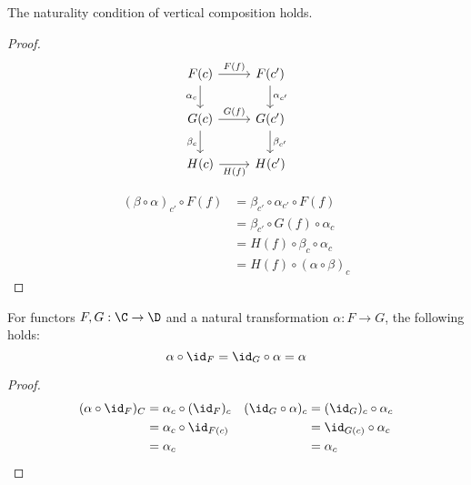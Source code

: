\begin{theorem}
  The naturality condition of vertical composition holds.
  \begin{proof}
    \[\begin{tikzcd}
      {F(c)} & {F(c')} \\
      {G(c)} & {G(c')} \\
      {H(c)} & {H(c')}
      \arrow["{F(f)}", from=1-1, to=1-2]
      \arrow["{G(f)}", from=2-1, to=2-2]
      \arrow["{H(f)}"', from=3-1, to=3-2]
      \arrow["{\alpha_c}"', from=1-1, to=2-1]
      \arrow["{\beta_c}"', from=2-1, to=3-1]
      \arrow["{\alpha_{c'}}", from=1-2, to=2-2]
      \arrow["{\beta_{c'}}", from=2-2, to=3-2]
    \end{tikzcd}\]

    \[
      \begin{aligned}
        (\beta \circ \alpha)_{c'} \circ F(f)
        &= \beta_{c'} \circ \alpha_{c'} \circ F(f)\\
        &= \beta_{c'} \circ G(f) \circ \alpha_c\\
        &= H(f) \circ \beta_c \circ \alpha_c\\
        &= H(f) \circ (\alpha \circ \beta)_c
      \end{aligned}
    \]
  \end{proof}
\end{theorem}

\begin{theorem}
  For functors $F,G:\C\to \D$ and a natural transformation $\alpha:F\to G$, the
  following holds:
  \[\alpha \circ \id_F = \id_G \circ \alpha = \alpha\]

  \begin{proof}
    \[
      \begin{aligned}
        (\alpha \circ \id_F)_C
        &= \alpha_c \circ (\id_F)_c\\
        &= \alpha_c \circ \id_{F(c)}\\
        &= \alpha_c
      \end{aligned}
      \quad
      \begin{aligned}
        (\id_G \circ \alpha)_c
        &= (\id_G)_c \circ \alpha_c\\
        &= \id_{G(c)} \circ \alpha_c\\
        &= \alpha_c
      \end{aligned}
    \]
  \end{proof}
\end{theorem}

